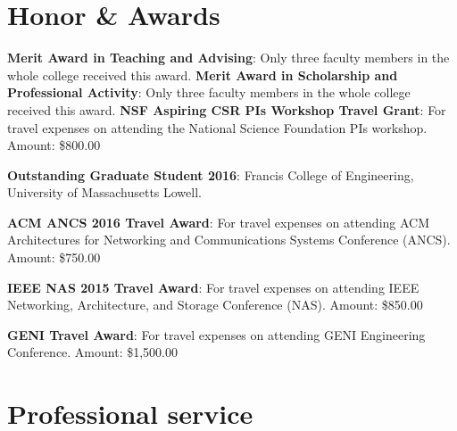 \documentclass[11pt]{moderncv}
\begin{document}
\section{Honor \& Awards}
%
{\textbf{Merit Award in Teaching and Advising}: Only three faculty members in the whole college received this award. \newline
}
%
{\textbf{Merit Award in Scholarship and Professional Activity}: Only three faculty members in the whole college received this award. \newline
}
%
{\textbf{NSF Aspiring CSR PIs Workshop Travel Grant}: For travel expenses on attending the National Science Foundation PIs workshop. \newline
Amount: \$800.00
}

%
{\textbf{Outstanding Graduate Student 2016}: Francis College of Engineering, University of Massachusetts Lowell.
}

%
{\textbf{ACM ANCS 2016 Travel Award}: For travel expenses on attending ACM Architectures for Networking and Communications Systems Conference (ANCS). \newline
Amount: \$750.00
}

%
{\textbf{IEEE NAS 2015 Travel Award}: For travel expenses on attending IEEE Networking, Architecture, and Storage Conference (NAS). \newline
Amount: \$850.00
}

%
{\textbf{GENI Travel Award}: For travel expenses on attending GENI Engineering Conference. \newline
Amount: \$1,500.00
}

\section{Professional service}
%

%

%
\end{document}
